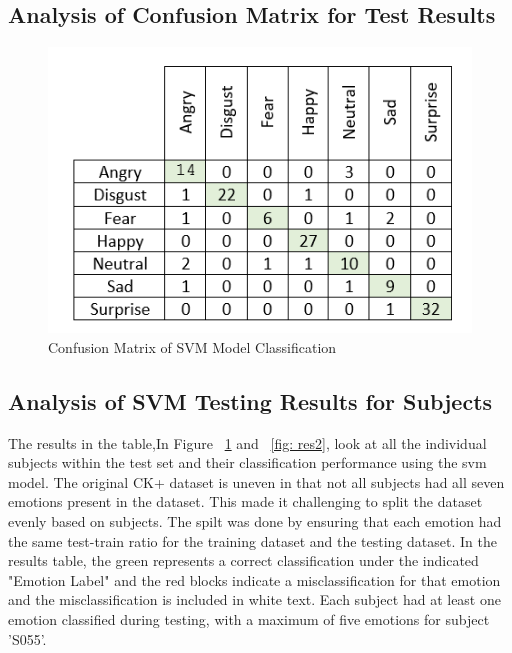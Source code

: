 \subsection{Analysis of Confusion Matrix for Test Results}
\begin{figure}[H]
  \centering
  \includegraphics[scale=1.5]{conf1}
  \caption{Confusion Matrix of SVM Model Classification}
  \label{fig: res1}
\end{figure} 


\subsection{Analysis of SVM Testing Results for Subjects}
The results in the table,In Figure ~\ref{fig: res1} and ~\ref{fig: res2}, look at all the individual subjects within the test set and their classification performance using the svm model. The original CK+ dataset is uneven in that not all subjects had all seven emotions present in the dataset. This made it challenging to split the dataset evenly based on subjects. The spilt was done by ensuring that each emotion had the same test-train ratio for the training dataset and the testing dataset. In the results table, the green represents a correct classification under the indicated "Emotion Label" and the red blocks indicate a misclassification for that emotion and the misclassification is included in white text. Each subject had at least one emotion classified during testing, with a maximum of five emotions for subject 'S055'. 

